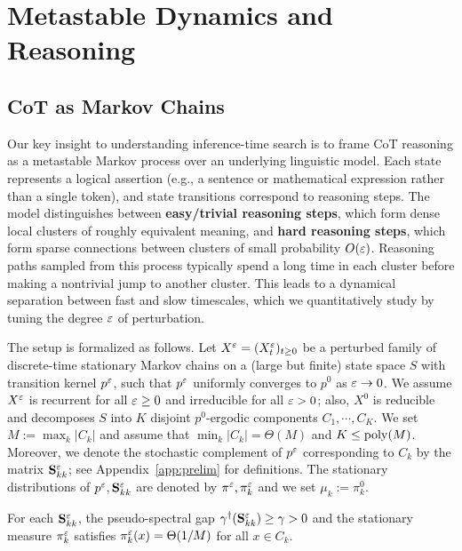 \section{Metastable Dynamics and Reasoning}
\label{sec:metastable}

\subsection{CoT as Markov Chains}

Our key insight to understanding inference-time search is to frame CoT reasoning as a metastable Markov process over an underlying linguistic model. Each state represents a logical assertion (e.g., a sentence or mathematical expression rather than a single token), and state transitions correspond to reasoning steps. The model distinguishes between \textbf{easy/trivial reasoning steps}, which form dense local clusters of roughly equivalent meaning, and \textbf{hard reasoning steps}, which form sparse connections between clusters of small probability $O(\varepsilon)$. Reasoning paths sampled from this process typically spend a long time in each cluster before making a nontrivial jump to another cluster. This leads to a dynamical separation between fast and slow timescales, which we quantitatively study by tuning the degree $\varepsilon$ of perturbation.

The setup is formalized as follows. Let $X^\varepsilon=(X_t^\varepsilon)_{t\ge 0}$ be a perturbed family of discrete-time stationary Markov chains on a (large but finite) state space $S$ with transition kernel $p^\varepsilon$, such that $p^\varepsilon$ uniformly converges to $p^0$ as $\varepsilon\to 0$. We assume $X^\varepsilon$ is recurrent for all $\varepsilon\ge 0$ and irreducible for all $\varepsilon>0$; also, $X^0$ is reducible and decomposes $S$ into $K$ disjoint $p^0$-ergodic components $C_1,\cdots,C_K$. We set $M:=\max_k |C_k|$ and assume that $\min_k|C_k| =\Theta(M)$ and $K\le\operatorname{poly}(M)$. Moreover, we denote the stochastic complement of $p^\varepsilon$ corresponding to $C_k$ by the matrix $\mathbf{S}_{kk}^\varepsilon$; see Appendix~\ref{app:prelim} for definitions. The stationary distributions of $p^\varepsilon,\mathbf{S}_{kk}^\varepsilon$ are denoted by $\pi^\varepsilon,\pi_k^\varepsilon$ and we set $\mu_k:=\pi_k^0$.

\begin{ass}\label{ass:cluster}
For each $\mathbf{S}_{kk}^\varepsilon$, the pseudo-spectral gap $\gamma^\dagger(\mathbf{S}_{kk}^\varepsilon) \ge\gamma>0$ and the stationary measure $\pi_k^\varepsilon$ satisfies $\pi_k^\varepsilon(x)=\Theta(1/M)$ for all $x\in C_k$.
\end{ass}

